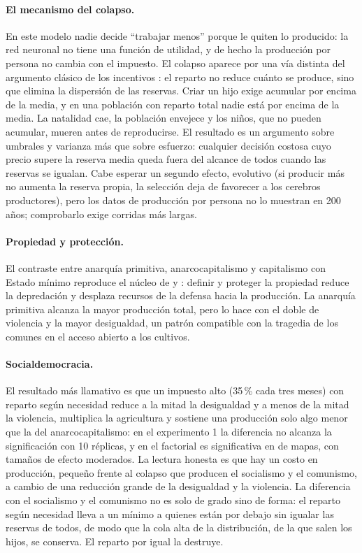 \documentclass[11pt,a4paper]{article}
\begin{document}
\paragraph{El mecanismo del colapso.} En este modelo nadie decide ``trabajar menos'' porque le quiten lo producido: la red neuronal no tiene una función de utilidad, y de hecho la producción por persona no cambia con el impuesto. El colapso aparece por una vía distinta del argumento clásico de los incentivos \citep{okun1975}: el reparto no reduce cuánto se produce, sino que elimina la dispersión de las reservas. Criar un hijo exige acumular por encima de la media, y en una población con reparto total nadie está por encima de la media. La natalidad cae, la población envejece y los niños, que no pueden acumular, mueren antes de reproducirse. El resultado es un argumento sobre umbrales y varianza más que sobre esfuerzo: cualquier decisión costosa cuyo precio supere la reserva media queda fuera del alcance de todos cuando las reservas se igualan. Cabe esperar un segundo efecto, evolutivo (si producir más no aumenta la reserva propia, la selección deja de favorecer a los cerebros productores), pero los datos de producción por persona no lo muestran en 200 años; comprobarlo exige corridas más largas.

\paragraph{Propiedad y protección.} El contraste entre anarquía primitiva, anarcocapitalismo y capitalismo con Estado mínimo reproduce el núcleo de \citet{demsetz1967} y \citet{north1990}: definir y proteger la propiedad reduce la depredación y desplaza recursos de la defensa hacia la producción. La anarquía primitiva alcanza la mayor producción total, pero lo hace con el doble de violencia y la mayor desigualdad, un patrón compatible con la tragedia de los comunes \citep{hardin1968} en el acceso abierto a los cultivos.

\paragraph{Socialdemocracia.} El resultado más llamativo es que un impuesto alto (35\,\% cada tres meses) con reparto según necesidad reduce a la mitad la desigualdad y a menos de la mitad la violencia, multiplica la agricultura y sostiene una producción solo algo menor que la del anarcocapitalismo: en el experimento 1 la diferencia no alcanza la significación con 10 réplicas, y en el factorial es significativa en \mapasSocdemProdMenor{} de \nMapas{} mapas, con tamaños de efecto moderados. La lectura honesta es que hay un costo en producción, pequeño frente al colapso que producen el socialismo y el comunismo, a cambio de una reducción grande de la desigualdad y la violencia. La diferencia con el socialismo y el comunismo no es solo de grado sino de forma: el reparto según necesidad lleva a un mínimo a quienes están por debajo sin igualar las reservas de todos, de modo que la cola alta de la distribución, de la que salen los hijos, se conserva. El reparto por igual la destruye.
\end{document}
